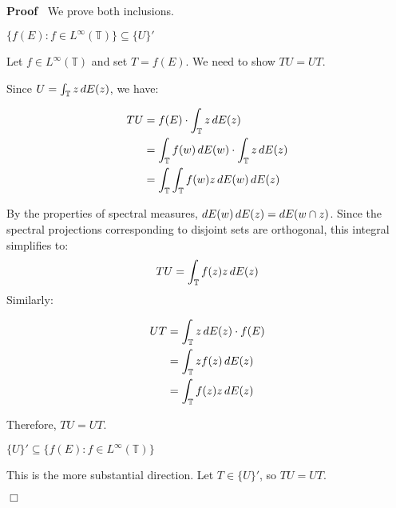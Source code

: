 \documentclass{article}
\newcommand{\tmtextbf}[1]{\text{{\bfseries{#1}}}}
\newenvironment{proof}{\noindent\textbf{Proof\ }}{\hspace*{\fill}$\Box$\medskip}
\begin{document}
\begin{proof}
  We prove both inclusions.
  
  \tmtextbf{Step 1:} $\{f (E) : f \in L^{\infty} (\mathbb{T})\} \subseteq
  \{U\}'$
  
  Let $f \in L^{\infty} (\mathbb{T})$ and set $T = f (E)$. We need to show $TU
  = UT$.
  
  Since $U = \int_{\mathbb{T}} z \hspace{0.17em} dE (z)$, we have:
  
  \begin{align}
    TU & = f (E) \cdot \int_{\mathbb{T}} z \hspace{0.17em} dE (z) \\
    & = \int_{\mathbb{T}} f (w)  \hspace{0.17em} dE (w) \cdot
    \int_{\mathbb{T}} z \hspace{0.17em} dE (z) \\
    & = \int_{\mathbb{T}} \int_{\mathbb{T}} f (w) z \hspace{0.17em} dE (w) 
    \hspace{0.17em} dE (z) 
  \end{align}
  
  By the properties of spectral measures, $dE (w)  \hspace{0.17em} dE (z) = dE
  (w \cap z)$. Since the spectral projections corresponding to disjoint sets
  are orthogonal, this integral simplifies to:
  \begin{equation}
    TU = \int_{\mathbb{T}} f (z) z \hspace{0.17em} dE (z)
  \end{equation}
  Similarly:
  
  \begin{align}
    UT & = \int_{\mathbb{T}} z \hspace{0.17em} dE (z) \cdot f (E) \\
    & = \int_{\mathbb{T}} zf (z)  \hspace{0.17em} dE (z) \\
    & = \int_{\mathbb{T}} f (z) z \hspace{0.17em} dE (z) 
  \end{align}
  
  Therefore, $TU = UT$.
  
  \tmtextbf{Step 2:} $\{U\}' \subseteq \{f (E) : f \in L^{\infty}
  (\mathbb{T})\}$
  
  This is the more substantial direction. Let $T \in \{U\}'$, so $TU = UT$.
  

\end{proof}
\end{document}
